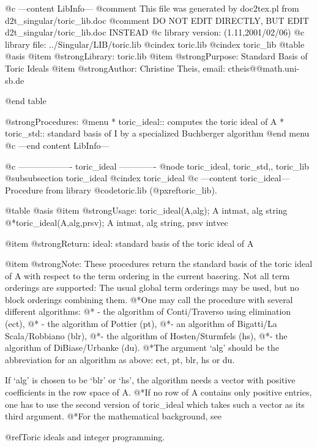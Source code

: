 @c ---content LibInfo---
@comment This file was generated by doc2tex.pl from d2t_singular/toric_lib.doc
@comment DO NOT EDIT DIRECTLY, BUT EDIT d2t_singular/toric_lib.doc INSTEAD
@c library version: (1.11,2001/02/06)
@c library file: ../Singular/LIB/toric.lib
@cindex toric.lib
@cindex toric_lib
@table @asis
@item @strong{Library:}
toric.lib
@item @strong{Purpose:}
   Standard Basis of Toric Ideals
@item @strong{Author:}
Christine Theis, email: ctheis@@math.uni-sb.de

@end table

@strong{Procedures:}
@menu
* toric_ideal:: computes the toric ideal of A
* toric_std:: standard basis of I by a specialized Buchberger algorithm
@end menu
@c ---end content LibInfo---

@c ------------------- toric_ideal -------------
@node toric_ideal, toric_std,, toric_lib
@subsubsection toric_ideal
@cindex toric_ideal
@c ---content toric_ideal---
Procedure from library @code{toric.lib} (@pxref{toric_lib}).

@table @asis
@item @strong{Usage:}
toric_ideal(A,alg); A intmat, alg string
@*toric_ideal(A,alg,prsv); A intmat, alg string, prsv intvec

@item @strong{Return:}
ideal: standard basis of the toric ideal of A

@item @strong{Note:}
These procedures return the standard basis of the toric ideal of A
with respect to the term ordering in the current basering. Not all
term orderings are supported: The usual global term orderings may be
used, but no block orderings combining them.
@*One may call the procedure with several different algorithms: @*
- the algorithm of Conti/Traverso using elimination (ect), @*
- the algorithm of Pottier (pt),
@*- an algorithm of Bigatti/La Scala/Robbiano (blr),
@*- the algorithm of Hosten/Sturmfels (hs),
@*- the algorithm of DiBiase/Urbanke (du).
@*The argument `alg' should be the abbreviation for an algorithm as
above: ect, pt, blr, hs or du.

If `alg' is chosen to be `blr' or `hs', the algorithm needs a vector
with positive coefficients in the row space of A.
@*If no row of A contains only positive entries, one has to use the
second version of toric_ideal which takes such a vector as its third
argument.
@*For the mathematical background, see

  @ref{Toric ideals and integer programming}.


